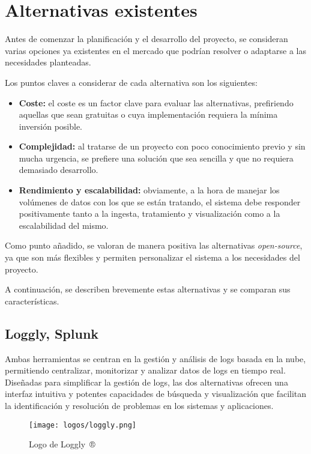 \section{Alternativas existentes}\label{sec:alternativas}
Antes de comenzar la planificación y el desarrollo del proyecto, se consideran
varias opciones ya existentes en el mercado que podrían resolver o adaptarse a
las necesidades planteadas.

Los puntos claves a considerar de cada alternativa son los siguientes:
\begin{itemize}
	\item \textbf{Coste:} el coste es un factor clave para evaluar las
		alternativas, prefiriendo aquellas que sean gratuitas o cuya
		implementación requiera la mínima inversión posible.
	\item \textbf{Complejidad:} al tratarse de un proyecto con poco conocimiento
		previo y sin mucha urgencia, se prefiere una solución que sea sencilla y
		que no requiera demasiado desarrollo.
	\item \textbf{Rendimiento y escalabilidad:} obviamente, a la hora de manejar
		los volúmenes de datos con los que se están tratando, el sistema debe
		responder positivamente tanto a la ingesta, tratamiento y visualización
		como a la escalabilidad del mismo.
\end{itemize}

Como punto añadido, se valoran de manera positiva las alternativas
\textit{open-source}, ya que son más flexibles y permiten personalizar el
sistema a los necesidades del proyecto.

A continuación, se describen brevemente estas alternativas y se comparan sus
características.

\subsection{Loggly, Splunk}
Ambas herramientas se centran en la gestión y análisis de logs basada en la nube,
permitiendo centralizar, monitorizar y analizar datos de logs en tiempo real.
Diseñadas para simplificar la gestión de logs, las dos alternativas ofrecen una
interfaz intuitiva y potentes capacidades de búsqueda y visualización que
facilitan la identificación y resolución de problemas en los sistemas y
aplicaciones.

\begin{figure}[H]
	\centering
	\texttt{[image: logos/loggly.png]}
	\caption{Logo de Loggly~®}
\end{figure}

